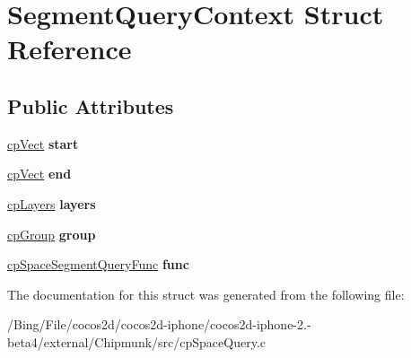 \hypertarget{struct_segment_query_context}{\section{Segment\-Query\-Context Struct Reference}
\label{struct_segment_query_context}
}
\subsection*{Public Attributes}
\begin{DoxyCompactItemize}
\item 
\hypertarget{struct_segment_query_context_abdbb776069966e4d7d6e6a1527e65936}{\hyperlink{structcp_vect}{cp\-Vect} {\bfseries start}}\label{struct_segment_query_context_abdbb776069966e4d7d6e6a1527e65936}

\item 
\hypertarget{struct_segment_query_context_a68bebb3a369296d0b95b14d37c9ebee5}{\hyperlink{structcp_vect}{cp\-Vect} {\bfseries end}}\label{struct_segment_query_context_a68bebb3a369296d0b95b14d37c9ebee5}

\item 
\hypertarget{struct_segment_query_context_a97868c2422aafd9abeda08eb2b5dda02}{\hyperlink{group__basic_types_ga5ec31e87ed3973cab80f9bfbbbcb43bb}{cp\-Layers} {\bfseries layers}}\label{struct_segment_query_context_a97868c2422aafd9abeda08eb2b5dda02}

\item 
\hypertarget{struct_segment_query_context_a42ea69664755bd6bbf9c222a61713832}{\hyperlink{group__basic_types_gacd811b1135a8f4a3e5cc019552b18b1a}{cp\-Group} {\bfseries group}}\label{struct_segment_query_context_a42ea69664755bd6bbf9c222a61713832}

\item 
\hypertarget{struct_segment_query_context_a40a572b5afa665dadc199b870889cab2}{\hyperlink{group__cp_space_gad48eefc60cdccc027c68b1f696e75838}{cp\-Space\-Segment\-Query\-Func} {\bfseries func}}\label{struct_segment_query_context_a40a572b5afa665dadc199b870889cab2}

\end{DoxyCompactItemize}


The documentation for this struct was generated from the following file\-:\begin{DoxyCompactItemize}
\item 
/\-Bing/\-File/cocos2d/cocos2d-\/iphone/cocos2d-\/iphone-\/2.-\/beta4/external/\-Chipmunk/src/cp\-Space\-Query.\-c\end{DoxyCompactItemize}
